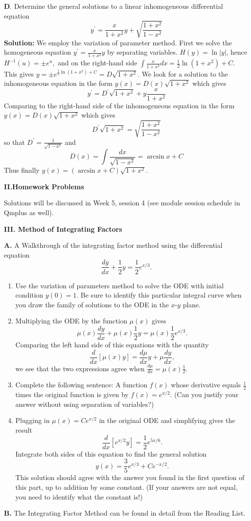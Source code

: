 \documentclass[11pt,a4paper,twoside]{article}
\begin{document}
	\textbf{D}. Determine the general solutions to a linear inhomogeneous differential equation
	$$
	y^\prime = \frac{x}{1+x^2}y + \sqrt{\frac{1+x^2}{1-x^2}}
	$$
	\textbf{Solution:} We employ the variation of parameter method. First we solve the homogeneous equation $y^\prime = \frac{x}{1+x^2}y$ by separating variables. $H(y) = \ln |y|$, hence $H^{-1}(u) = \pm e^u,$ and on the right-hand side $\int \frac{x}{1+x^2}dx = \frac{1}{2}\ln (1+x^2)+C$. This gives $y = \pm e^{\frac{1}{2}\ln (1+x^2)+C} = D\sqrt{1+x^2}$. We look for a solution to the inhomogeneous equation in the form $y(x) = D(x)\sqrt{1+x^2}$ which gives
	$$
	y^\prime = D^\prime\sqrt{1+x^2}+y\frac{x}{1+x^2}
	$$
	Comparing to the right-hand side of the inhomogeneous equation in the form $y(x) = D(x)\sqrt{1+x^2}$ which gives
	$$
	D^\prime\sqrt{1+x^2} = \sqrt{\frac{1+x^2}{1-x^2}}
	$$
	so that $D^\prime = \frac{1}{\sqrt{1-x^2}}$ and
	$$
	D(x) = \int \frac{dx}{\sqrt{1-x^2}} = \arcsin x + C
	$$
	Thus finally $y(x) = (\arcsin x +C)\sqrt{1+x^2}$.\par
	\textbf{II.Homework Problems} \par
	Solutions will be discussed in Week 5, session 4 (see module session schedule in Qmplus as well).\par
	\textbf{III. Method of Integrating Factors}\par
	\textbf{A. }A Walkthrough of the integrating factor method using the differential equation
	$$
	\frac{dy}{dx}+\frac{1}{2}y=\frac{1}{2}e^{x/3}.
	$$
	\begin{enumerate}[\bfseries 1)]
		\item Use the variation of parameters method to solve the ODE with initial condition $y(0) = 1$. Be sure to identify this particular integral curve when you draw the family of solutions to the ODE in the $x \text{-} y$ plane.
		\item Multiplying the ODE by the function $\mu(x)$ gives
		$$
		\mu(x)\frac{dy}{dx}+\mu(x)\frac{1}{2}y=\mu(x)\frac{1}{2}e^{x/3}.
		$$
		Comparing the left hand side of this equations with the quantity
		$$
		\frac{d}{dx}[\mu(x)y] = \frac{d\mu}{dx}y+\mu\frac{dy}{dx},
		$$
		we see that the two expressions agree when $\frac{d\mu}{dx}=\mu(x)\frac{1}{2}$.
		\item Complete the following sentence: A function $f(x)$ whose derivative equals $\frac{1}{2}$ times the original function is given by $f(x)=e^{x/2}$. (Can you justify your answer without using separation of variables?)
		\item Plugging in $\mu(x) = Ce^{x/2}$ in the original ODE and simplifying gives the result
		$$
		\frac{d}{dx}[e^{x/2}y]=\frac{1}{2}e^{5x/6}.
		$$
		Integrate both sides of this equation to find the general solution
		$$
		y(x) = \frac{3}{5}e^{x/3} + Ce^{-x/2}.
		$$
		This solution should agree with the answer you found in the first question of this part, up to addition by some constant. (If your answers are not equal, you need to identify what the constant is!)
	\end{enumerate}
	\textbf{B.} The Integrating Factor Method can be found in detail from the Reading List.
\end{document}
